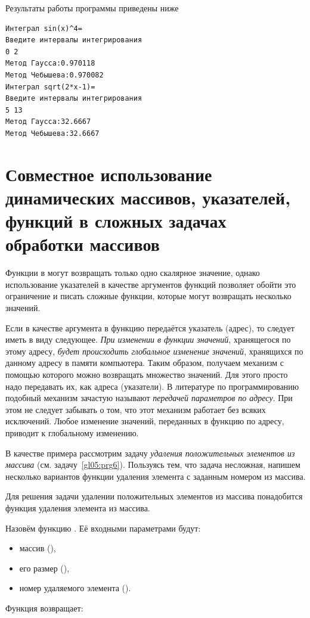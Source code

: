 Результаты работы программы приведены ниже
\begin{verbatim}
Интеграл sin(x)^4= 
Введите интервалы интегрирования 
0 2 
Метод Гаусса:0.970118 
Метод Чебышева:0.970082 
Интеграл sqrt(2*x-1)= 
Введите интервалы интегрирования 
5 13 
Метод Гаусса:32.6667 
Метод Чебышева:32.6667
\end{verbatim}

\section[Совместное использование динамических массивов]{Совместное использование динамических массивов, указателей, функций в сложных задачах обработки массивов}
Функции в  могут возвращать только одно скалярное значение, однако использование указателей в качестве аргументов
функций позволяет обойти это ограничение и писать сложные функции, которые могут возвращать несколько значений.

Если в качестве аргумента в функцию передаётся указатель (адрес), то следует иметь в виду следующее. \emph{При
изменении в функции значений}, хранящегося по этому адресу, \emph{будет происходить глобальное изменение значений},
хранящихся по данному адресу в памяти компьютера. Таким образом, получаем механизм с помощью которого можно возвращать
множество значений. Для этого просто надо передавать их, как адреса (указатели). В литературе по программированию
подобный механизм зачастую называют \emph{передачей параметров по адресу}. При этом не следует забывать о том, что
этот механизм работает без всяких исключений. Любое изменение значений, переданных в функцию по адресу, приводит к
глобальному изменению.

В качестве примера рассмотрим задачу \emph{удаления положительных элементов из массива} (см. задачу~\ref{gl05:prg6}).
Пользуясь тем, что задача несложная, напишем несколько вариантов функции удаления элемента с заданным номером из
массива.

Для решения задачи удалении положительных элементов из массива понадобится функция удаления элемента из массива.

Назовём функцию . Её входными параметрами будут:

\begin{itemize}
\item массив (),
\item его размер (),
\item номер удаляемого элемента ().
\end{itemize}
Функция возвращает:

